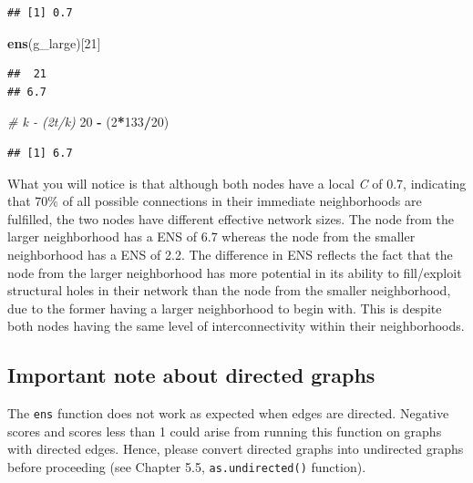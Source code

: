 \documentclass[
]{book}
\newenvironment{Shaded}{\begin{snugshade}}{\end{snugshade}}
\newcommand{\CommentTok}[1]{\textcolor[rgb]{0.56,0.35,0.01}{\textit{#1}}}
\newcommand{\DecValTok}[1]{\textcolor[rgb]{0.00,0.00,0.81}{#1}}
\newcommand{\FunctionTok}[1]{\textcolor[rgb]{0.13,0.29,0.53}{\textbf{#1}}}
\newcommand{\NormalTok}[1]{#1}
\newcommand{\SpecialCharTok}[1]{\textcolor[rgb]{0.81,0.36,0.00}{\textbf{#1}}}
\begin{document}
\begin{verbatim}
## [1] 0.7
\end{verbatim}

\begin{Shaded}
\begin{Highlighting}[]
\FunctionTok{ens}\NormalTok{(g\_large)[}\DecValTok{21}\NormalTok{]}
\end{Highlighting}
\end{Shaded}

\begin{verbatim}
##  21 
## 6.7
\end{verbatim}

\begin{Shaded}
\begin{Highlighting}[]
\CommentTok{\# k {-} (2t/k)}
\DecValTok{20} \SpecialCharTok{{-}}\NormalTok{ (}\DecValTok{2}\SpecialCharTok{*}\DecValTok{133}\SpecialCharTok{/}\DecValTok{20}\NormalTok{)}
\end{Highlighting}
\end{Shaded}

\begin{verbatim}
## [1] 6.7
\end{verbatim}

What you will notice is that although both nodes have a local \emph{C} of 0.7, indicating that 70\% of all possible connections in their immediate neighborhoods are fulfilled, the two nodes have different effective network sizes. The node from the larger neighborhood has a ENS of 6.7 whereas the node from the smaller neighborhood has a ENS of 2.2. The difference in ENS reflects the fact that the node from the larger neighborhood has more potential in its ability to fill/exploit structural holes in their network than the node from the smaller neighborhood, due to the former having a larger neighborhood to begin with. This is despite both nodes having the same level of interconnectivity within their neighborhoods.

\subsection{Important note about directed graphs}\label{important-note-about-directed-graphs-1}

The \texttt{ens} function does not work as expected when edges are directed. Negative scores and scores less than 1 could arise from running this function on graphs with directed edges. Hence, please convert directed graphs into undirected graphs before proceeding (see Chapter 5.5, \texttt{as.undirected()} function).
\end{document}
